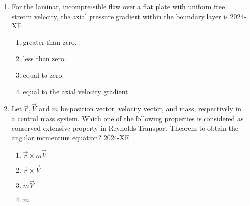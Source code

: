 \documentclass[journal,12pt,onecolumn]{IEEEtran}
\theoremstyle{remark}
\begin{document}
\begin{enumerate}
	\item For the laminar, incompressible flow over a flat plate with uniform free stream velocity, the axial pressure gradient within the boundary layer is
	\hfill{2024-XE}

		\begin{enumerate}
			\item greater than zero.
			\item less than zero.
			\item equal to zero.
			\item equal to the axial velocity gradient.
		\end{enumerate}

	\item Let $\vec{r}, \vec{V}$ and $m$ be position vector, velocity vector, and mass, respectively in a control mass system. Which one of the following properties is considered as conserved extensive property in Reynolds Transport Theorem to obtain the angular momentum equation?
	\hfill{2024-XE}

		\begin{enumerate}
			\item $\vec{r} \times m\vec{V}$
			\item $\vec{r} \times \vec{V}$
			\item $m\vec{V}$
			\item $m$
		\end{enumerate}

\end{enumerate}
\end{document}
